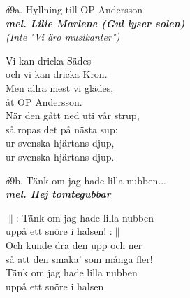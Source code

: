 \documentclass[a6paper,10pt]{article}
\newcommand{\mel}[1]{\small\textbf{\textit{mel. #1 \\}}}
\begin{document}
\setlength{\oddsidemargin}{-0.47in}
\noindent
\begin{center}
\Large $\delta9$a. Hyllning till OP Andersson\\ 
\mel{Lilie Marlene (Gul lyser solen)}
\textit{(Inte "Vi äro musikanter")}
\end{center}
Vi kan dricka Sädes \\
och vi kan dricka Kron. \\
Men allra mest vi glädes, \\
åt OP Andersson.
\vspace{5pt}\\
När den gått ned uti vår strup, \\
så ropas det på nästa sup: \\
ur svenska hjärtans djup, \\
ur svenska hjärtans djup. 
\vspace{30pt}
\begin{center}
\Large $\delta9$b. Tänk om jag hade lilla nubben...\\ 
\mel{Hej tomtegubbar}
\end{center}
$\|$: Tänk om jag hade lilla nubben \\
uppå ett snöre i halsen! :$\|$
\vspace{5pt}\\
Och kunde dra den upp och ner \\
så att den smaka' som många fler! \\
Tänk om jag hade lilla nubben \\
uppå ett snöre i halsen 
\end{document}
